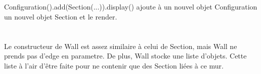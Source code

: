 \documentclass{article}
\begin{document}
\section{}
\setcounter{subsection}{1}
\subsection{}
Configuration().add(Section(...)).display() ajoute à un nouvel objet Configuration un nouvel objet Section et le render. 

\section{}
\subsection{}
Le constructeur de Wall est assez similaire à celui de Section, mais Wall ne prends pas d'edge en parametre. De plus, Wall stocke une liste d'objets. Cette liste à l'air d'être faite pour ne contenir que des Section liées à ce mur. 
\end{document}
